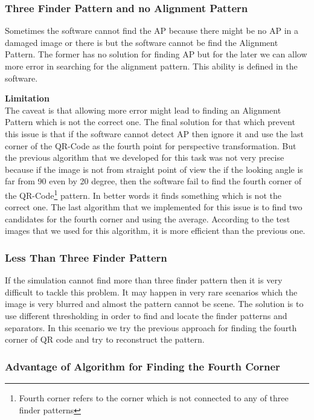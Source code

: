 \subsubsection{Three Finder Pattern and no Alignment Pattern}

Sometimes the software cannot find the AP because there might be no AP in a damaged image or there is but the software cannot be find the Alignment Pattern. The former has no solution for finding AP but for the later we can allow more error in searching for the alignment pattern. This ability is defined in the software. 

\textbf{Limitation} \\

The caveat is that allowing more error might lead to finding an Alignment Pattern which is not the correct one. The final solution for that which prevent this issue is that if the software cannot detect AP then ignore it and use the last corner of the QR-Code as the fourth point for perspective transformation. But the previous algorithm that we developed for this task was not very precise because if the image is not from straight point of view the if the looking angle is far from 90 even by 20 degree, then the software fail to find the fourth corner of the QR-Code\footnote{Fourth corner refers to the corner which is not connected to any of three finder patterns} pattern. In better words it finds something which is not the correct one. The last algorithm that we implemented for this issue is to find two candidates for the fourth corner and using the average. According to the test images that we used for this algorithm, it is more efficient than the previous one.

\subsubsection{Less Than Three Finder Pattern}

If the simulation cannot find more than three finder pattern then it is very difficult to tackle this problem. It may happen in very rare scenarios which the image is very blurred and almost the pattern cannot be scene. The solution is to use different thresholding in order to find and locate the finder patterns and separators. In this scenario we try the previous approach for finding the fourth corner of QR code and try to reconstruct the pattern.

\subsubsection{Advantage of Algorithm for Finding the Fourth Corner}

